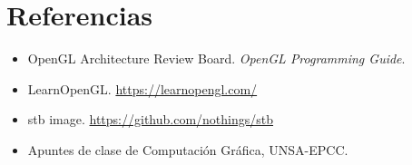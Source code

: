 \documentclass[12pt,a4paper]{article}
\begin{document}
\section*{Referencias}

\begin{itemize}[noitemsep]
  \item OpenGL Architecture Review Board. \textit{OpenGL Programming Guide}.
  \item LearnOpenGL. \url{https://learnopengl.com/}
  \item stb image. \url{https://github.com/nothings/stb}
  \item Apuntes de clase de Computación Gráfica, UNSA-EPCC.
\end{itemize}
\end{document}
